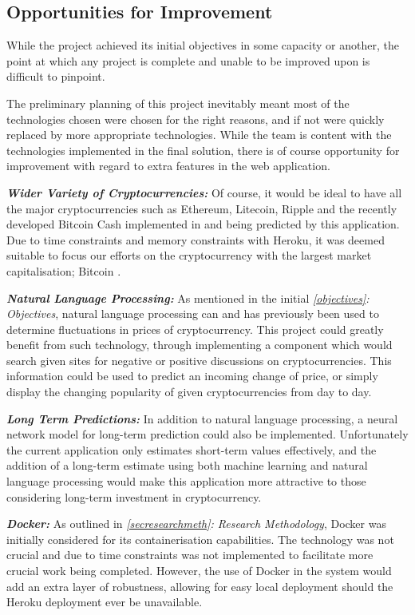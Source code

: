 \subsection{Opportunities for Improvement}
While the project achieved its initial objectives in some capacity or another, the point at which any project is complete and unable to be improved upon is difficult to pinpoint.

The preliminary planning of this project inevitably meant most of the technologies chosen were chosen for the right reasons, and if not were quickly replaced by more appropriate technologies. While the team is content with the technologies implemented in the final solution, there is of course opportunity for improvement with regard to extra features in the web application. 

\textit{\textbf{Wider Variety of Cryptocurrencies:}} Of course, it would be ideal to have all the major cryptocurrencies such as Ethereum, Litecoin, Ripple and the recently developed Bitcoin Cash implemented in and being predicted by this application. Due to time constraints and memory constraints with Heroku, it was deemed suitable to focus our efforts on the cryptocurrency with the largest market capitalisation; Bitcoin \cite{coinmarketcap}.

\textit{\textbf{Natural Language Processing:}} As mentioned in the initial \textit{\ref{objectives}: Objectives}, natural language processing can and has previously been used \cite{socmedimpact} to determine fluctuations in prices of cryptocurrency. This project could greatly benefit from such technology, through implementing a component which would search given sites for negative or positive discussions on cryptocurrencies. This information could be used to predict an incoming change of price, or simply display the changing popularity of given cryptocurrencies from day to day.

\textit{\textbf{Long Term Predictions:}} In addition to natural language processing, a neural network model for long-term prediction could also be implemented. Unfortunately the current application only estimates short-term values effectively, and the addition of a long-term estimate using both machine learning and natural language processing would make this application more attractive to those considering long-term investment in cryptocurrency.

\textit{\textbf{Docker:}} As outlined in \textit{\ref{secresearchmeth}: Research Methodology}, Docker was initially considered for its containerisation capabilities. The technology was not crucial and due to time constraints was not implemented to facilitate more crucial work being completed. However, the use of Docker in the system would add an extra layer of robustness, allowing for easy local deployment should the Heroku deployment ever be unavailable.


